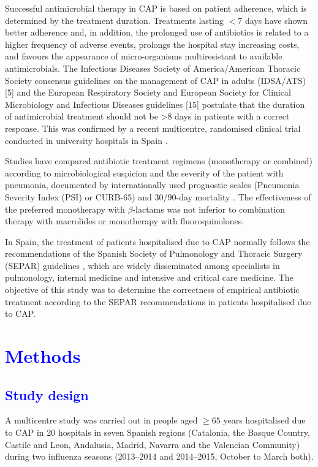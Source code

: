 \documentclass[11pt, a4paper]{article}
\begin{document}
\begin{multicols}{2}
Successful antimicrobial therapy in CAP is based on patient adherence, which is determined by the treatment duration. Treatments lasting $<7$ days have shown better adherence and, in
addition, the prolonged use of antibiotics is related to a higher frequency of adverse events, prolongs the hospital stay increasing costs, and favours the appearance of micro-organisms multiresistant to available antimicrobials. The Infectious Diseases Society of America/American Thoracic Society consensus guidelines on the management of CAP in adults (IDSA/ATS) [5] and the European Respiratory Society and European Society for Clinical
Microbiology and Infectious Diseases guidelines [15] postulate that the duration of antimicrobial treatment should not be >8 days in patients with a correct response. This was confirmed by a recent multicentre, randomised clinical trial conducted in university
hospitals in Spain \cite{uranga2016duration}.

Studies have compared antibiotic treatment regimens (monotherapy or combined) according to microbiological suspicion and the severity of the patient with pneumonia, documented by
internationally used prognostic scales (Pneumonia Severity Index (PSI) or CURB-65) \cite{eccles2014diagnosis} and 30/90-day mortality \cite{postma2015antibiotic, van2015antibiotics}. The effectiveness of the preferred monotherapy with $\beta$-lactams was not inferior to combination therapy with macrolides or monotherapy with fluoroquinolones.

In Spain, the treatment of patients hospitalised due to CAP normally follows the recommendations of the Spanish Society of Pulmonology and Thoracic Surgery (SEPAR) guidelines \cite{menendez2010neumonia}, which are widely disseminated among specialists in pulmonology, internal medicine and intensive and critical care medicine. The objective of this study was to determine the correctness of empirical antibiotic treatment according to the SEPAR recommendations in patients hospitalised due to CAP.

\section*{\textcolor{blue}{Methods}}
\subsection*{\textcolor{blue}{Study design}}
A multicentre study was carried out in people aged $\geq65$ years hospitalised due to CAP in 20 hospitals in seven Spanish regions (Catalonia, the Basque Country, Castile and Leon, Andalusia, Madrid, Navarra and the Valencian Community) during two influenza seasons (2013–2014 and 2014–2015, October to March both).


\end{multicols}
\end{document}

